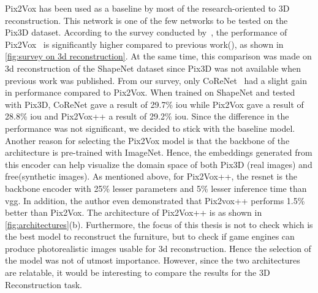 Pix2Vox has been used as a baseline by most of the research-oriented to 3D reconstruction.
This network is one of the few networks to be tested on the Pix3D dataset.
According to the survey conducted by~\cite{Han2021ImageBased3O}, the performance of Pix2Vox~\cite{Xie_2019}
is significantly higher compared to previous work(\cite{Tulsiani2017,tatarchenko2016multiview,Roth2018,Gwak2018,Johnston2017}), as shown in \autoref{fig:survey on 3d reconstruction}.
At the same time, this comparison was made on 3d reconstruction of the ShapeNet dataset since Pix3D was not available when previous work was published.
From our survey, only CoReNet~\cite{popov2020corenet} had a slight gain in performance compared to Pix2Vox.
When trained on ShapeNet and tested with Pix3D, CoReNet gave a result of 29.7\% \gls{iou} while Pix2Vox gave a result of 28.8\% \gls{iou}  and Pix2Vox++ a result of 29.2\% \gls{iou}\@.
Since the difference in the performance was not significant, we decided to stick with the baseline model.
Another reason for selecting the Pix2Vox model is that the backbone of the architecture is pre-trained with ImageNet.
Hence, the embeddings generated from this encoder can help visualize the domain space of both Pix3D (real images)  and \gls{free}(synthetic images).
As mentioned above, for Pix2Vox++, the \gls{resnet} is the backbone encoder with 25\% lesser parameters and 5\% lesser inference time than \gls{vgg}\@.
In addition, the author even demonstrated that Pix2vox++ performs 1.5\% better than Pix2Vox.
The architecture of Pix2Vox++ is as shown in \autoref{fig:architectures}(b).
Furthermore, the focus of this thesis is not to check which is the best model to reconstruct the furniture, but to check if game engines can produce photorealistic images usable for 3d reconstruction.
Hence the selection of the model was not of utmost importance.
However, since the two architectures are relatable, it would be interesting to compare the results for the 3D Reconstruction task.

%


